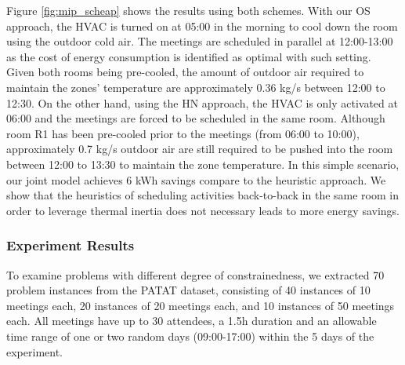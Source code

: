 Figure \ref{fig:mip_scheap} shows the results using both schemes. With our OS approach, the HVAC is turned on at 05:00 in the morning to cool down the room using the outdoor cold air. The meetings are scheduled in parallel at 12:00-13:00 as the cost of energy consumption is identified as optimal with such setting. Given both rooms being pre-cooled, the amount of outdoor air required to maintain the zones' temperature are approximately 0.36 kg/s between 12:00 to 12:30. On the other hand, using the HN approach, the HVAC is only activated at 06:00 and the meetings are forced to be scheduled in the same room. Although room R1 has been pre-cooled prior to the meetings (from 06:00 to 10:00), approximately 0.7 kg/s outdoor air are still required to be pushed into the room between 12:00 to 13:30 to maintain the zone temperature. In this simple scenario, our joint model achieves 6 kWh savings compare to the heuristic approach. We show that the heuristics of scheduling activities back-to-back in the same room in order to leverage thermal inertia does not necessary leads to more energy savings.


\vspace*{10ex}
\subsubsection{Experiment Results} 

To examine problems with different degree of constrainedness, we extracted 70 problem instances from the PATAT dataset, consisting of 
40 instances of 10 meetings each, 20 instances of 20 meetings each, and 10 instances of 50 meetings each. All meetings have up to 30 attendees, a 1.5h duration and an allowable time range of one or two random days (09:00-17:00) within the 5 days of the experiment.


